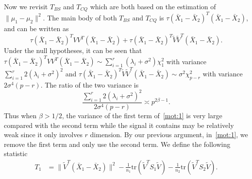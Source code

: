 Now we revisit $T_{BS}$ and $T_{CQ}$ which are both based on the estimation of $\|\mu_1-\mu_2\|^2$.
The main body of both $T_{BS}$ and $T_{CQ}$ is
$
    \tau{(\bar{X}_1-\bar{X}_2)}^T (\bar{X}_1-\bar{X}_2)
$, and can be written as
\begin{equation}\label{mot:1}
    \tau{(\bar{X}_1-\bar{X}_2)}^T V V^T (\bar{X}_1-\bar{X}_2)+
    \tau{(\bar{X}_1-\bar{X}_2)}^T \tilde{V} \tilde{V}^T (\bar{X}_1-\bar{X}_2).
\end{equation}
Under the null hypotheses, it can be seen that $\tau{(\bar{X}_1-\bar{X}_2)}^T V V^T (\bar{X}_1-\bar{X}_2)\sim \sum_{i=1}^r (\lambda_i+\sigma^2)\chi^2_1$ with variance $\sum_{i=1}^r 2(\lambda_i+\sigma^2)^2$ and $\tau{(\bar{X}_1-\bar{X}_2)}^T \tilde{V} \tilde{V}^T (\bar{X}_1-\bar{X}_2)\sim \sigma^2\chi^2_{p-r}$ with variance $2\sigma^4 (p-r)$.
The ratio of the two variance is
$$
\frac{\sum_{i=1}^r 2(\lambda_i+\sigma^2)^2}{2\sigma^4 (p-r)}
\asymp
p^{2\beta-1}.
$$
Thus when $\beta>1/2$, the variance of the first term of~\eqref{mot:1} is very large compared with the second term while the signal it contains may be relatively weak since it only involves $r$ dimension.
 By our previous argument, in~\eqref{mot:1}, we remove the first term and only use the second term.
We define the following statistic
\begin{equation*}
\begin{aligned}
    T_{1}&=\|\tilde{V}^T(\bar{X}_1-\bar{X}_2)\|^2-\frac{1}{n_1}\mathrm{tr}(\tilde{V}^T S_1\tilde{V})-\frac{1}{n_2}\mathrm{tr}(\tilde{V}^T S_2\tilde{V}).
    \\
\end{aligned}
\end{equation*}
